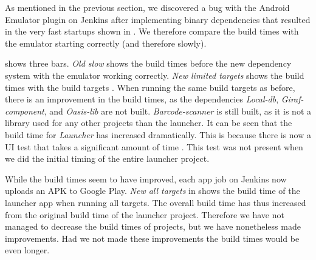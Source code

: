 As mentioned in the previous section, we discovered a bug with the Android Emulator plugin on Jenkins after implementing binary dependencies that resulted in the very fast startups shown in . We therefore compare the build times with the emulator starting correctly (and therefore slowly).

 shows three bars. \emph{Old slow} shows the build times before the new dependency system with the emulator working correctly. \emph{New limited targets} shows the build times with the build targets . When running the same build targets as before, there is an improvement in the build times, as the dependencies \emph{Local-db}, \emph{Giraf-component}, and \emph{Oasis-lib} are not built. \emph{Barcode-scanner} is still built, as it is not a library used for any other projects than the launcher. It can be seen that the build time for \emph{Launcher} has increased dramatically. This is because there is now a UI test that takes a significant amount of time . This test was not present when we did the initial timing of the entire launcher project.

While the build times seem to have improved, each app job on Jenkins now uploads an APK to Google Play. \emph{New all targets} in  shows the build time of the launcher app when running all targets. The overall build time has thus increased from the original build time of the launcher project. Therefore we have not managed to decrease the build times of projects, but we have nonetheless made improvements. Had we not made these improvements the build times would be even longer.

